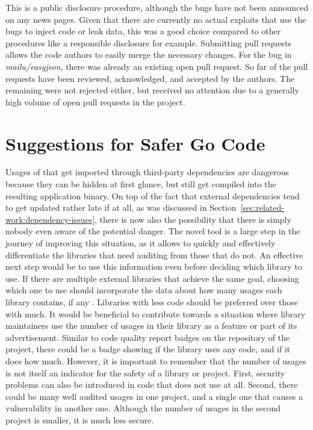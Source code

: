 

This is a public disclosure procedure, although the bugs have not been announced on any news pages.
Given that there are currently no actual exploits that use the bugs to inject code or leak data, this was a good choice
compared to other procedures like a responsible disclosure for example.
Submitting \github{} pull requests allows the code authors to easily merge the necessary changes.
For the bug in \textit{mailu/easyjson}, there was already an existing open pull request.
So far \numberPRsMerged{} of the pull requests have been reviewed, acknowledged, and accepted by the authors.
The remaining were not rejected either, but received no attention due to a generally high volume of open pull requests
in the project.



\section{Suggestions for Safer Go Code}\label{sec:discussion:safer-go-code}

Usages of \unsafe{} that get imported through third-party dependencies are dangerous because they can be hidden at first
glance, but still get compiled into the resulting application binary.
On top of the fact that external dependencies tend to get updated rather late if at all, as was discussed in
Section~\ref{sec:related-work:dependency-issues}, there is now also the possibility that there is simply nobody even
aware of the potential danger.
The novel tool \toolGeiger{} is a large step in the journey of improving this situation, as it allows to quickly and
effectively differentiate the libraries that need auditing from those that do not.
An effective next step would be to use this information even before deciding which library to use.
If there are multiple external libraries that achieve the same goal, choosing which one to use should incorporate the
data about how many \unsafe{} usages each library contains, if any .
Libraries with less \unsafe{} code should be preferred over those with much.
It would be beneficial to contribute towards a situation where library maintainers use the number of \unsafe{} usages
in their library as a feature or part of its advertisement.
Similar to code quality report badges on the \github{} repository of the project, there could be a badge showing if the
library uses any \unsafe{} code, and if it does how much.
However, it is important to remember that the number of \unsafe{} usages is not itself an indicator for the safety of
a library or project.
First, security problems can also be introduced in code that does not use \unsafe{} at all.
Second, there could be many well audited \unsafe{} usages in one project, and a single one that causes a vulnerability
in another one.
Although the number of \unsafe{} usages in the second project is smaller, it is much less secure.

